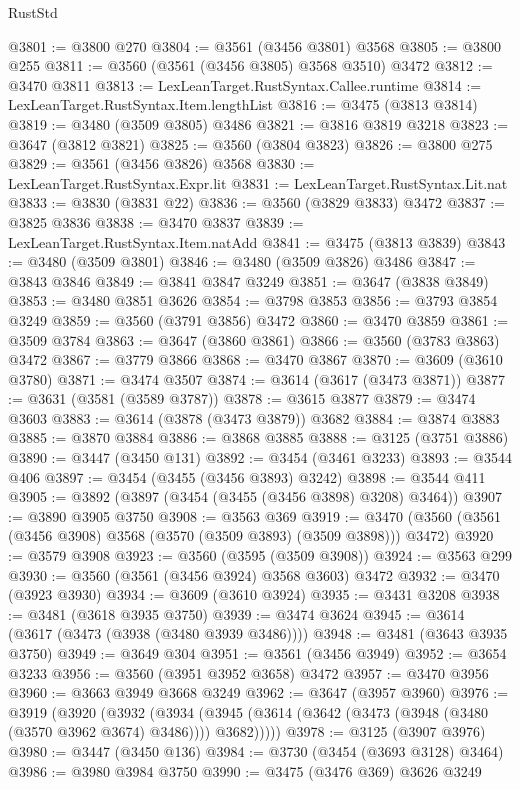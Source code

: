 \begin{lexlean}{RustStd}
\begin{coremodule}
{\begin{coremodule}
{{{{{{{{{{{{{{{{{{{{{{{{{{{{{{{{{{{{{{{{{{{{{@3801 := @3800 @270
@3804 := @3561 (@3456 @3801) @3568
@3805 := @3800 @255
@3811 := @3560 (@3561 (@3456 @3805) @3568 @3510) @3472
@3812 := @3470 @3811
@3813 := LexLeanTarget.RustSyntax.Callee.runtime
@3814 := LexLeanTarget.RustSyntax.Item.lengthList
@3816 := @3475 (@3813 @3814)
@3819 := @3480 (@3509 @3805) @3486
@3821 := @3816 @3819 @3218
@3823 := @3647 (@3812 @3821)
@3825 := @3560 (@3804 @3823)
@3826 := @3800 @275
@3829 := @3561 (@3456 @3826) @3568
@3830 := LexLeanTarget.RustSyntax.Expr.lit
@3831 := LexLeanTarget.RustSyntax.Lit.nat
@3833 := @3830 (@3831 @22)
@3836 := @3560 (@3829 @3833) @3472
@3837 := @3825 @3836
@3838 := @3470 @3837
@3839 := LexLeanTarget.RustSyntax.Item.natAdd
@3841 := @3475 (@3813 @3839)
@3843 := @3480 (@3509 @3801)
@3846 := @3480 (@3509 @3826) @3486
@3847 := @3843 @3846
@3849 := @3841 @3847 @3249
@3851 := @3647 (@3838 @3849)
@3853 := @3480 @3851 @3626
@3854 := @3798 @3853
@3856 := @3793 @3854 @3249
@3859 := @3560 (@3791 @3856) @3472
@3860 := @3470 @3859
@3861 := @3509 @3784
@3863 := @3647 (@3860 @3861)
@3866 := @3560 (@3783 @3863) @3472
@3867 := @3779 @3866
@3868 := @3470 @3867
@3870 := @3609 (@3610 @3780)
@3871 := @3474 @3507
@3874 := @3614 (@3617 (@3473 @3871))
@3877 := @3631 (@3581 (@3589 @3787))
@3878 := @3615 @3877
@3879 := @3474 @3603
@3883 := @3614 (@3878 (@3473 @3879)) @3682
@3884 := @3874 @3883
@3885 := @3870 @3884
@3886 := @3868 @3885
@3888 := @3125 (@3751 @3886)
@3890 := @3447 (@3450 @131)
@3892 := @3454 (@3461 @3233)
@3893 := @3544 @406
@3897 := @3454 (@3455 (@3456 @3893) @3242)
@3898 := @3544 @411
@3905 := @3892 (@3897 (@3454 (@3455 (@3456 @3898) @3208) @3464))
@3907 := @3890 @3905 @3750
@3908 := @3563 @369
@3919 := @3470 (@3560 (@3561 (@3456 @3908) @3568 (@3570 (@3509 @3893) (@3509 @3898))) @3472)
@3920 := @3579 @3908
@3923 := @3560 (@3595 (@3509 @3908))
@3924 := @3563 @299
@3930 := @3560 (@3561 (@3456 @3924) @3568 @3603) @3472
@3932 := @3470 (@3923 @3930)
@3934 := @3609 (@3610 @3924)
@3935 := @3431 @3208
@3938 := @3481 (@3618 @3935 @3750)
@3939 := @3474 @3624
@3945 := @3614 (@3617 (@3473 (@3938 (@3480 @3939 @3486))))
@3948 := @3481 (@3643 @3935 @3750)
@3949 := @3649 @304
@3951 := @3561 (@3456 @3949)
@3952 := @3654 @3233
@3956 := @3560 (@3951 @3952 @3658) @3472
@3957 := @3470 @3956
@3960 := @3663 @3949 @3668 @3249
@3962 := @3647 (@3957 @3960)
@3976 := @3919
    (@3920
      (@3932
        (@3934 (@3945 (@3614 (@3642 (@3473 (@3948 (@3480 (@3570 @3962 @3674) @3486)))) @3682)))))
@3978 := @3125 (@3907 @3976)
@3980 := @3447 (@3450 @136)
@3984 := @3730 (@3454 (@3693 @3128) @3464)
@3986 := @3980 @3984 @3750
@3990 := @3475 (@3476 @369) @3626 @3249
}}}}}}}}}}}}}}}}}}}}}}}}}}}}}}}}}}}}}}}}}}}}}
\end{coremodule}}
\end{coremodule}
\end{lexlean}
